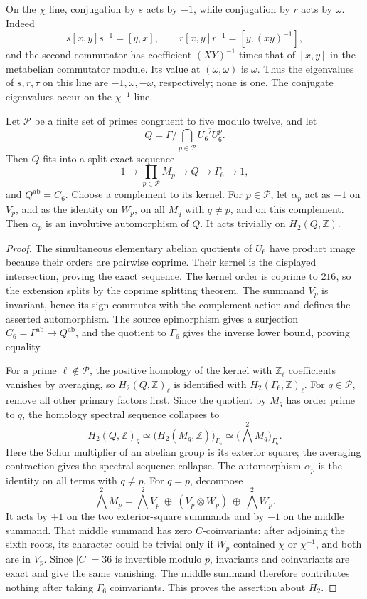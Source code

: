 On the $\chi$ line, conjugation by $s$ acts by $-1$, while
conjugation by $r$ acts by $\omega$. Indeed
\[
 s[x,y]s^{-1}=[y,x],\qquad
 r[x,y]r^{-1}=[y,(xy)^{-1}],
\]
and the second commutator has coefficient $(XY)^{-1}$ times that
of $[x,y]$ in the metabelian commutator module. Its value at
$(\omega,\omega)$ is $\omega$. Thus the eigenvalues of $s,r,\tau$
on this line are $-1,\omega,-\omega$, respectively; none is one.
The conjugate eigenvalues occur on the $\chi^{-1}$ line.

\begin{lemma}\label{lem:cover-sign-homology}
Let $\mathcal P$ be a finite set of primes congruent to five modulo
twelve, and let
\[
 Q=\Gamma\Big/
       \bigcap_{p\in\mathcal P}\overline{U_6'U_6^p}.
\]
Then $Q$ fits into a split exact sequence
\[
 1\longrightarrow\prod_{p\in\mathcal P}M_p
   \longrightarrow Q\longrightarrow\Gamma_6\longrightarrow1,
\]
and $Q^{\mathrm{ab}}=C_6$. Choose a complement to its kernel.
For $p\in\mathcal P$, let $\alpha_p$ act as $-1$ on $V_p$, and
as the identity on $W_p$, on all $M_q$ with $q\ne p$, and on this
complement. Then $\alpha_p$ is an involutive automorphism of $Q$.
It acts trivially on $H_2(Q,\mathbb Z)$.
\end{lemma}

\begin{proof}
The simultaneous elementary abelian quotients of $U_6$ have product
image because their orders are pairwise coprime. Their kernel is the
displayed intersection, proving the exact sequence. The kernel order
is coprime to $216$, so the extension splits by the coprime splitting
theorem. The summand $V_p$ is invariant, hence its sign commutes with
the complement action and defines the asserted automorphism.
The source epimorphism gives a surjection $C_6=\Gamma^{\mathrm{ab}}
\to Q^{\mathrm{ab}}$, and the quotient to $\Gamma_6$ gives the
inverse lower bound, proving equality.

For a prime $\ell\notin\mathcal P$, the positive homology of the
kernel with $\mathbb Z_\ell$ coefficients vanishes by averaging,
so $H_2(Q,\mathbb Z)_\ell$ is identified with
$H_2(\Gamma_6,\mathbb Z)_\ell$. For $q\in\mathcal P$, remove
all other primary factors first. Since the quotient by $M_q$ has
order prime to $q$, the homology spectral sequence collapses to
\[
 H_2(Q,\mathbb Z)_q
      \simeq\bigl(H_2(M_q,\mathbb Z)\bigr)_{\Gamma_6}
      \simeq\bigl(\textstyle\bigwedge^2M_q\bigr)_{\Gamma_6}.
\]
Here the Schur multiplier of an abelian group is its exterior square;
the averaging contraction gives the spectral-sequence collapse.
The automorphism $\alpha_p$ is the identity on all terms with
$q\ne p$. For $q=p$, decompose
\[
 \bigwedge^2M_p=
   \bigwedge^2V_p\ \oplus\ (V_p\otimes W_p)\ \oplus\ \bigwedge^2W_p.
\]
It acts by $+1$ on the two exterior-square summands and by $-1$ on
the middle summand. That middle summand has zero $C$-coinvariants:
after adjoining the sixth roots, its character could be trivial
only if $W_p$ contained $\chi$ or $\chi^{-1}$, and both are in
$V_p$. Since $|C|=36$ is invertible modulo $p$, invariants and
coinvariants are exact and give the same vanishing. The middle
summand therefore contributes nothing after taking $\Gamma_6$
coinvariants. This proves the assertion about $H_2$.
\end{proof}

